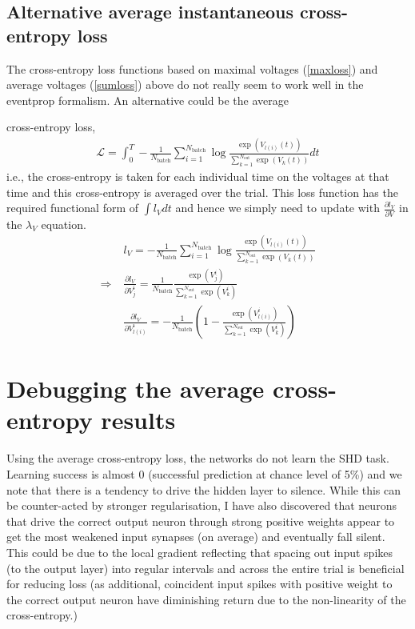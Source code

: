 \documentclass[a4paper]{article}
\begin{document}
  \subsection{Alternative average instantaneous cross-entropy loss}
  The cross-entropy loss functions based on maximal voltages (\ref{maxloss}) and
  average voltages (\ref{sumloss}) above do not really seem to work well in the
  eventprop formalism. An alternative could be the average
  
  cross-entropy loss,
  \begin{align}
    {\mathcal L} = \int_0^T - \frac{1}{N_{\text{batch}}}
    \sum_{i=1}^{N_{\text{batch}}} \log
    \frac{\exp(V_{l(i)}(t))}{\sum_{k=1}^{N_{\text{out}}} \exp(V_k(t))} dt
  \end{align} 
  i.e., the cross-entropy is taken for each individual time on the
  voltages at that time and this cross-entropy is averaged over the
  trial. This loss function has the required functional form of $\int
  l_V dt$ and hence we simply need to update with $\frac{\partial
    l_V}{\partial V}$ in the $\lambda_V$ equation.
  \begin{align}
    & l_V= - \frac{1}{N_{\text{batch}}}
    \sum_{i=1}^{N_{\text{batch}}} \log
    \frac{\exp(V_{l(i)}(t))}{\sum_{k=1}^{N_{\text{out}}} \exp(V_k(t))}
    \\
    \Rightarrow \; & \frac{\partial l_V}{\partial V_j^i} =
    \frac{1}{N_{\text{batch}}}
    \frac{\exp(V_j^i)}{\sum_{k=1}^{N_{\text{out}}} \exp(V_k^i)} \\
    & \frac{\partial l_V}{\partial V_{l(i)}^i} =
    - \frac{1}{N_{\text{batch}}} \left(
    1 - \frac{\exp(V_{l(i)}^i)}{\sum_{k=1}^{N_{\text{out}}}
      \exp(V_k^i)} \right) 
  \end{align}

  \section{Debugging the average cross-entropy results}
  Using the average cross-entropy loss, the networks do not learn the SHD task. Learning success is almost 0 (successful prediction at chance level of 5\%) and we note that there is a tendency to drive the hidden layer to silence. While this can be counter-acted by stronger regularisation, I have also discovered that neurons that drive the correct output neuron through strong positive weights appear to get the most weakened input synapses (on average) and eventually fall silent.
  This could be due to the local gradient reflecting that spacing out input spikes (to the output layer) into regular intervals and across the entire trial is beneficial for reducing loss (as additional, coincident input spikes with positive weight to the correct output neuron have diminishing return due to the non-linearity of the cross-entropy.)
\end{document}

